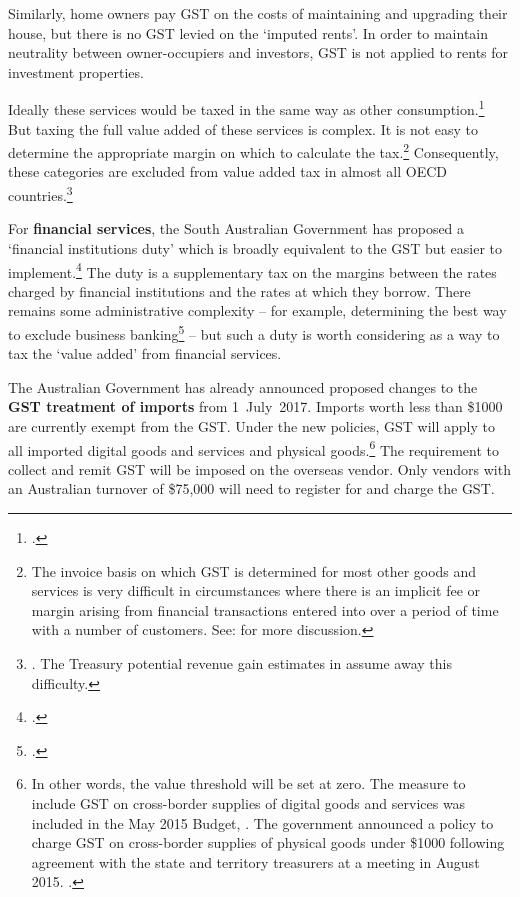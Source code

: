 \documentclass{grattanAlpha}
\begin{document}
Similarly, home owners pay GST on the costs of maintaining and upgrading their house, but there is no GST levied on the ‘imputed rents’. In order to maintain neutrality between owner-occupiers and investors, GST is not applied to rents for investment properties.

Ideally these services would be taxed in the same way as other consumption.\footcites{Freebairn2013}[][52]{HenryTaxReview2010}  But taxing the full value added of these services is complex. It is not easy to determine the appropriate margin on which to calculate the tax.\footnote{The invoice basis on which GST is determined for most other goods and services is very difficult in circumstances where there is an implicit fee or margin arising from financial transactions entered into over a period of time with a number of customers. See: \textcites{Evans2015}{Davis2015} for more discussion.}  
Consequently, these categories are excluded from value added tax in almost all OECD countries.\footnote{\textcite[][21]{OECD2014}. The Treasury potential revenue gain estimates in  assume away this difficulty.}  

For \textbf{financial services}, the South Australian Government has proposed a ‘financial institutions duty’ which is broadly equivalent to the GST but easier to implement.\footcites{Evans2015}{Weatherill2015}  The duty is a supplementary tax on the margins between the rates charged by financial institutions and the rates at which they borrow. There remains some administrative complexity – for example, determining the best way to exclude business banking\footcite{Davis2015}  – but such a duty is worth considering as a way to tax the ‘value added’ from financial services. 

The Australian Government has already announced proposed changes to the \textbf{GST treatment of imports} from 1~July~2017. Imports worth less than \$1000 are currently exempt from the GST. Under the new policies, GST will apply to all imported digital goods and services and physical goods.\footnote{In other words, the value threshold will be set at zero. The measure to include GST on cross-border supplies of digital goods and services was included in the May 2015 Budget,
\textcite[][20]{Treasury2015BudgetPapers201516}. The government announced a policy to charge GST on cross-border supplies of physical goods under \$1000 following agreement with the state and territory treasurers at a meeting in August 2015. \textcite{Hockey2015--GST-import-threshold}.}  The requirement to collect and remit GST will be imposed on the overseas vendor. Only vendors with an Australian turnover of \$75,000 will need to register for and charge the GST.
\end{document}

